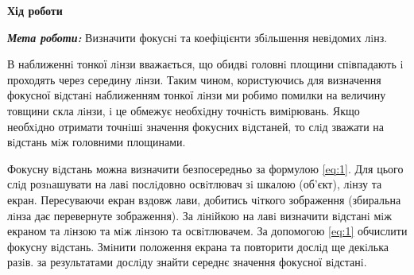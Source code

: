 \begin{center}
    \Large{\textbf{Хід роботи}}    
\end{center}

\vspace{1mm}

\textit{\textbf{Мета роботи:}} Визначити фокуснi та коефiцiєнти збiльшення невiдомих лiнз.
\bigbreak

В наближеннi тонкої лiнзи вважається, що обидвi головнi площини спiвпадають i проходять через
середину лiнзи. Таким чином, користуючись для визначення фокусної вiдстанi наближенням тонкої лiнзи
ми робимо помилки на величину товщини скла лiнзи, i це обмежує необхiдну точнiсть вимiрювань. Якщо
необхiдно отримати точнiшi значення фокусних вiдстаней, то слiд зважати на вiдстань мiж головними
площинами.

Фокусну вiдстань можна визначити безпосередньо за формулою \ref{eq:1}. Для цього слiд розnашувати на
лавi послiдовно освiтлювач зi шкалою (об’єкт), лiнзу та екран. Пересуваючи екран вздовж лави, добитись
чiткого зображення (збиральна лiнза дає перевернуте зображення). За лiнiйкою на лавi визначити
вiдстанi мiж екраном та лiнзою та мiж лiнзою та освiтлювачем. За допомогою \ref{eq:1} обчислити фокусну
вiдстань. Змiнити положення екрана та повторити дослiд ще декiлька разiв. за результатами дослiду 
знайти середнє значення фокусної вiдстанi.